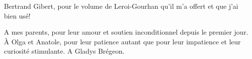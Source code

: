 Bertrand Gibert, pour le volume de Leroi-Gourhan qu'il m'a offert et que j'ai bien usé!








A mes parents, pour leur amour et soutien inconditionnel depuis le premier jour.
À Olga et Anatole, pour leur patience autant que pour leur impatience et leur curiosité stimulante.
A Gladys Brégeon.
